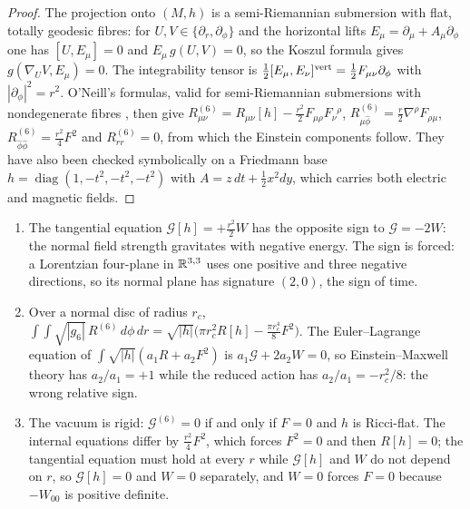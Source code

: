 \begin{proof}
The projection onto $(M,h)$ is a semi-Riemannian submersion with flat, totally geodesic fibres: for $U,V\in\{\partial_r,\partial_\phi\}$ and the horizontal lifts
$E_\mu=\partial_\mu+A_\mu\partial_\phi$ one has $[U,E_\mu]=0$ and $E_\mu\,g(U,V)=0$, so the Koszul formula gives $g(\nabla_UV,E_\mu)=0$. The integrability tensor is
$\tfrac12[E_\mu,E_\nu]^{\rm vert}=\tfrac12F_{\mu\nu}\partial_\phi$ with $|\partial_\phi|^2=r^2$. O'Neill's formulas, valid for semi-Riemannian submersions with nondegenerate
fibres \cite{ONeill66,ONeill83,Besse87}, then give $R^{(6)}_{\mu\nu}=R_{\mu\nu}[h]-\tfrac{r^2}2F_{\mu\rho}F_\nu{}^\rho$, $R^{(6)}_{\mu\hat\phi}=\tfrac r2\nabla^\rho F_{\rho\mu}$,
$R^{(6)}_{\hat\phi\hat\phi}=\tfrac{r^2}4F^2$ and $R^{(6)}_{rr}=0$, from which the Einstein components follow. They have also been checked symbolically on a Friedmann base
$h=\operatorname{diag}(1,-t^2,-t^2,-t^2)$ with $A=z\,dt+\tfrac12x^2dy$, which carries both electric and magnetic fields.
\end{proof}

\begin{corollary}
\label{cor:ein6}
\begin{enumerate}[label=(\roman*),leftmargin=2.2em]
\item The tangential equation $\mathcal G[h]=+\tfrac{r^2}2W$ has the opposite sign to $\mathcal G=-2W$: the normal field strength gravitates with negative energy.
The sign is forced: a Lorentzian four-plane in $\mathbb{R}^{3,3}$ uses one positive and three negative directions, so its normal plane has signature $(2,0)$, the
sign of time.
\item Over a normal disc of radius $r_c$, $\int\!\!\int\sqrt{|g_6|}\,R^{(6)}\,d\phi\,dr=\sqrt{|h|}\bigl(\pi r_c^2R[h]-\tfrac{\pi r_c^4}8F^2\bigr)$. The Euler--Lagrange
equation of $\int\sqrt{|h|}(a_1R+a_2F^2)$ is $a_1\mathcal G+2a_2W=0$, so Einstein--Maxwell theory has $a_2/a_1=+1$ while the reduced action has $a_2/a_1=-r_c^2/8$: the
wrong relative sign.
\item The vacuum is rigid: $\mathcal G^{(6)}=0$ if and only if $F=0$ and $h$ is Ricci-flat. The internal equations differ by $\tfrac{r^2}4F^2$, which forces $F^2=0$ and
then $R[h]=0$; the tangential equation must hold at every $r$ while $\mathcal G[h]$ and $W$ do not depend on $r$, so $\mathcal G[h]=0$ and $W=0$ separately, and $W=0$
forces $F=0$ because $-W_{00}$ is positive definite.
\end{enumerate}
\end{corollary}

